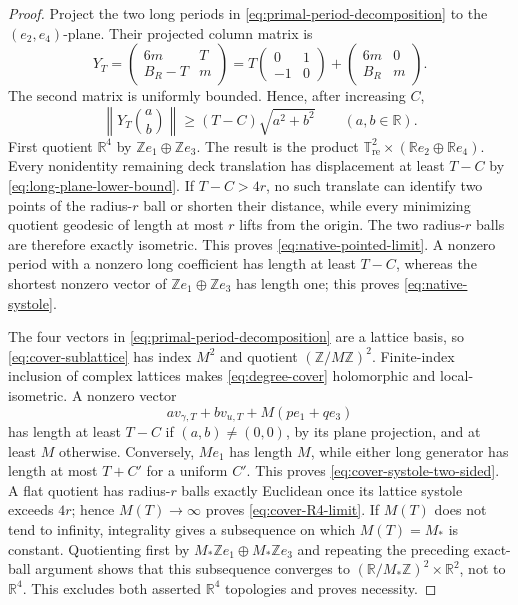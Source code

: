 \documentclass[11pt]{article}
\numberwithin{equation}{section}
\theoremstyle{definition}
\theoremstyle{remark}
\newcommand{\R}{\mathbb R}
\newcommand{\Z}{\mathbb Z}
\newcommand{\T}{\mathbb T}
\begin{document}
\begin{proof}
Project the two long periods in \eqref{eq:primal-period-decomposition} to
the $(e_2,e_4)$-plane.  Their projected column matrix is
\begin{equation}\label{eq:long-plane-matrix}
 Y_T=\begin{pmatrix}6m&T\\B_R-T&m\end{pmatrix}
 =T\begin{pmatrix}0&1\\-1&0\end{pmatrix}
  +\begin{pmatrix}6m&0\\B_R&m\end{pmatrix}.
\end{equation}
The second matrix is uniformly bounded.  Hence, after increasing $C$,
\begin{equation}\label{eq:long-plane-lower-bound}
 \left\|Y_T\binom ab\right\|
 \ge(T-C)\sqrt{a^2+b^2}
 \qquad(a,b\in\R).
\end{equation}
First quotient $\R^4$ by $\Z e_1\oplus\Z e_3$.  The result is the product
$\T^2_{\mathrm{re}}\times(\R e_2\oplus\R e_4)$.  Every nonidentity
remaining deck translation has displacement at least $T-C$ by
\eqref{eq:long-plane-lower-bound}.  If $T-C>4r$, no such translate can
identify two points of the radius-$r$ ball or shorten their distance, while
every minimizing quotient geodesic of length at most $r$ lifts from the
origin.  The two radius-$r$ balls are therefore exactly isometric.  This
proves \eqref{eq:native-pointed-limit}.  A nonzero period with a nonzero long
coefficient has length at least $T-C$, whereas the shortest nonzero vector
of $\Z e_1\oplus\Z e_3$ has length one; this proves
\eqref{eq:native-systole}.

The four vectors in \eqref{eq:primal-period-decomposition} are a lattice
basis, so \eqref{eq:cover-sublattice} has index $M^2$ and quotient
$(\Z/M\Z)^2$.  Finite-index inclusion of complex lattices makes
\eqref{eq:degree-cover} holomorphic and local-isometric.  A nonzero vector
\[
 av_{\gamma,T}+bv_{u,T}+M(pe_1+qe_3)
\]
has length at least $T-C$ if $(a,b)\ne(0,0)$, by its plane projection, and
at least $M$ otherwise.  Conversely, $Me_1$ has length $M$, while either
long generator has length at most $T+C'$ for a uniform $C'$.  This proves
\eqref{eq:cover-systole-two-sided}.  A flat quotient has radius-$r$ balls
exactly Euclidean once its lattice systole exceeds $4r$; hence $M(T)\to
\infty$ proves \eqref{eq:cover-R4-limit}.  If $M(T)$ does not tend to
infinity, integrality gives a subsequence on which $M(T)=M_*$ is constant.
Quotienting first by $M_*\Z e_1\oplus M_*\Z e_3$ and repeating the preceding
exact-ball argument shows that this subsequence converges to
$(\R/M_*\Z)^2\times\R^2$, not to $\R^4$.  This excludes both asserted
$\R^4$ topologies and proves necessity.


\end{proof}
\end{document}
